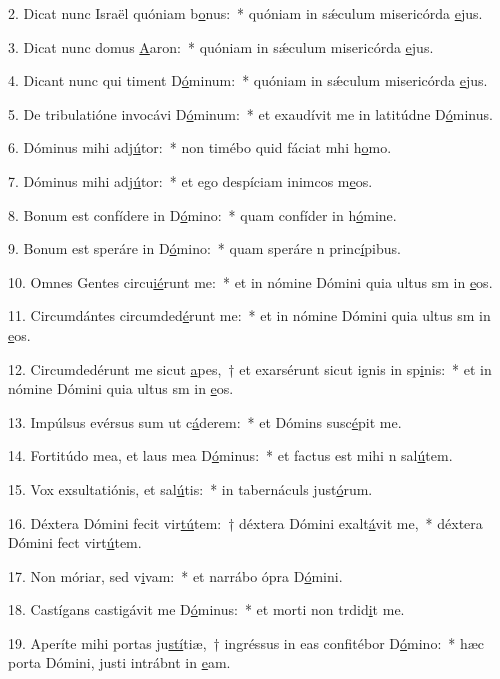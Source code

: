 2. Dicat nunc Israël quóniam b\uline{o}nus:~* quóniam in sǽculum misericórda \uline{e}jus.\par 
3. Dicat nunc domus \uline{A}aron:~* quóniam in sǽculum misericórda \uline{e}jus.\par 
4. Dicant nunc qui timent D\uline{ó}minum:~* quóniam in sǽculum misericórda \uline{e}jus.\par 
5. De tribulatióne invocávi D\uline{ó}minum:~* et exaudívit me in latitúdne D\uline{ó}minus.\par 
6. Dóminus mihi adj\uline{ú}tor:~* non timébo quid fáciat mhi h\uline{o}mo.\par 
7. Dóminus mihi adj\uline{ú}tor:~* et ego despíciam inimcos m\uline{e}os.\par 
8. Bonum est confídere in D\uline{ó}mino:~* quam confíder in h\uline{ó}mine.\par 
9. Bonum est speráre in D\uline{ó}mino:~* quam speráre n princ\uline{í}pibus.\par 
10. Omnes Gentes circu\uline{ié}runt me:~* et in nómine Dómini quia ultus sm in \uline{e}os.\par 
11. Circumdántes circumded\uline{é}runt me:~* et in nómine Dómini quia ultus sm in \uline{e}os.\par 
12. Circumdedérunt me sicut \uline{a}pes,~† et exarsérunt sicut ignis in sp\uline{i}nis:~* et in nómine Dómini quia ultus sm in \uline{e}os.\par 
13. Impúlsus evérsus sum ut c\uline{á}derem:~* et Dómins susc\uline{é}pit me.\par 
14. Fortitúdo mea, et laus mea D\uline{ó}minus:~* et factus est mihi n sal\uline{ú}tem.\par 
15. Vox exsultatiónis, et sal\uline{ú}tis:~* in tabernáculs just\uline{ó}rum.\par 
16. Déxtera Dómini fecit vir\uline{tú}tem:~† déxtera Dómini exalt\uline{á}vit me,~* déxtera Dómini fect virt\uline{ú}tem.\par 
17. Non móriar, sed v\uline{i}vam:~* et narrábo ópra D\uline{ó}mini.\par 
18. Castígans castigávit me D\uline{ó}minus:~* et morti non trdid\uline{i}t me.\par 
19. Aperíte mihi portas ju\uline{stí}tiæ,~† ingréssus in eas confitébor D\uline{ó}mino:~* hæc porta Dómini, justi intrábnt in \uline{e}am.\par 
